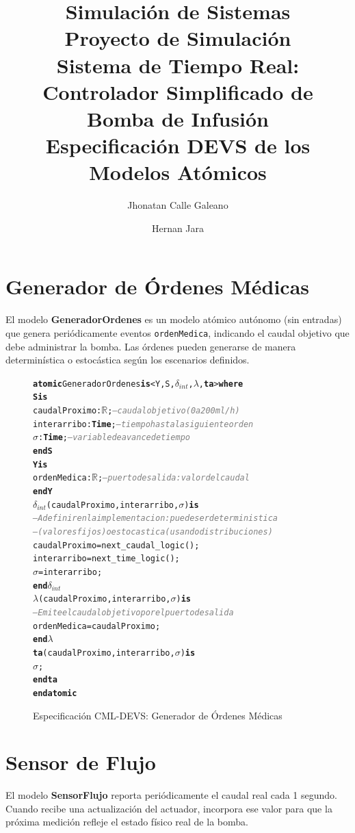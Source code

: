 \documentclass[12pt, a4paper]{article}
\title{
    \large Simulación de Sistemas \\[0.5em]
    \LARGE \textbf{Proyecto de Simulación} \\[0.3em]
    \large Sistema de Tiempo Real: Controlador Simplificado de Bomba de Infusión \\[1em]
    \normalsize Especificación DEVS de los Modelos Atómicos
}
\author{
    Jhonatan Calle Galeano \and Hernan Jara
}
\date{}
\newcommand{\kw}[1]{\textbf{#1}}          %
\newcommand{\cmlR}{$\mathbb{R}$}
\newcommand{\cmlTime}{\textbf{Time}}
\newcommand{\cmlsigma}{$\sigma$}
\newcommand{\dint}{$\delta_{\mathit{int}}$}
\newcommand{\clambda}{$\lambda$}
\newcommand{\cmlta}{\textbf{ta}}
\newcommand{\cmlcomment}[1]{\textit{\textcolor{gray}{#1}}}
\newenvironment{cmldevs}{%
  \begin{alltt}\small%
}{%
  \end{alltt}%
}
\begin{document}
\maketitle
\thispagestyle{empty}

\section{Generador de Órdenes Médicas}

El modelo \textbf{GeneradorOrdenes} es un modelo atómico autónomo (sin entradas)
que genera periódicamente eventos \texttt{ordenMedica}, indicando el caudal objetivo
que debe administrar la bomba. Las órdenes pueden generarse de manera determinística
o estocástica según los escenarios definidos.

\begin{figure}[H]
\begin{cmldevs}
\kw{atomic} GeneradorOrdenes \kw{is} <Y, S, \dint{}, \clambda{}, \cmlta{}> \kw{where}
\kw{S is}
    caudalProximo : \cmlR{};    \cmlcomment{-- caudal objetivo (0 a 200 ml/h)}
    interarribo   : \cmlTime{};  \cmlcomment{-- tiempo hasta la siguiente orden}
    \cmlsigma{}             : \cmlTime{};  \cmlcomment{-- variable de avance de tiempo}
\kw{end S}
\kw{Y is}
    ordenMedica : \cmlR{};      \cmlcomment{-- puerto de salida: valor del caudal}
\kw{end Y}
\dint{}(caudalProximo, interarribo, \cmlsigma{}) \kw{is}
    \cmlcomment{-- A definir en la implementacion: puede ser deterministica}
    \cmlcomment{-- (valores fijos) o estocastica (usando distribuciones)}
    caudalProximo = next\_caudal\_logic();
    interarribo   = next\_time\_logic();
    \cmlsigma{}   = interarribo;
\kw{end} \dint{}
\clambda{}(caudalProximo, interarribo, \cmlsigma{}) \kw{is}
    \cmlcomment{-- Emite el caudal objetivo por el puerto de salida}
    ordenMedica = caudalProximo;
\kw{end} \clambda{}
\cmlta{}(caudalProximo, interarribo, \cmlsigma{}) \kw{is}
    \cmlsigma{};
\kw{end} \cmlta{}
\kw{end atomic}
\end{cmldevs}
\caption{Especificación CML-DEVS: Generador de Órdenes Médicas}
\label{fig:generador-ordenes}
\end{figure}


\section{Sensor de Flujo}

El modelo \textbf{SensorFlujo} reporta periódicamente el caudal real cada 1 segundo.
Cuando recibe una actualización del actuador, incorpora ese valor para que la próxima
medición refleje el estado físico real de la bomba.
\end{document}
